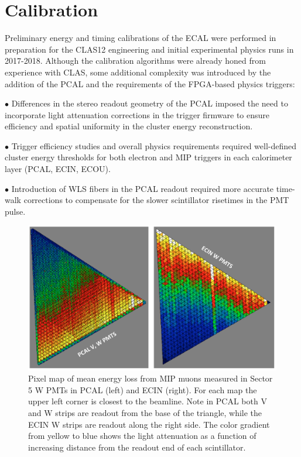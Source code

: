 \section{Calibration}
\label{Calibration}

Preliminary energy and timing calibrations of the ECAL were performed in preparation for the CLAS12 engineering
and initial experimental physics runs in 2017-2018. Although the calibration algorithms were already honed from
experience with CLAS, some additional complexity was introduced by the addition of the PCAL and the requirements
of the FPGA-based physics triggers: 

$\bullet$ Differences in the stereo readout geometry of the PCAL imposed the need to incorporate light attenuation
corrections in the trigger firmware to ensure efficiency and spatial uniformity in the cluster energy reconstruction.

$\bullet$ Trigger efficiency studies and overall physics requirements required well-defined cluster energy
thresholds for both electron and MIP triggers in each calorimeter layer (PCAL, ECIN, ECOU).

$\bullet$ Introduction of WLS fibers in the PCAL readout required more accurate time-walk corrections to
compensate for the slower scintillator risetimes in the PMT pulse.

\begin{figure}[hbt]
\centering
\includegraphics[width=1.0\columnwidth,keepaspectratio]{img/S9_1_1.png}
\caption[]{Pixel map of mean energy loss from MIP muons measured in Sector 5 W PMTs in PCAL (left) and ECIN
  (right). For each map the upper left corner is closest to the beamline. Note in PCAL both V and W strips are readout
  from the base of the triangle, while the ECIN W strips are readout along the right side. The color gradient from
  yellow to blue shows the light attenuation as a function of increasing distance from the readout end of each scintillator.}
\label{fig:S9_1_1}
\end{figure}

